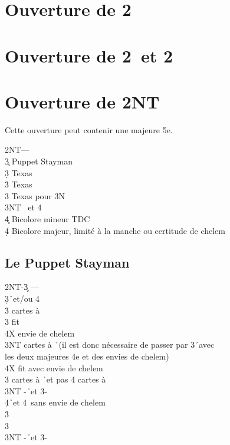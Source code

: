 \documentclass[a4paper]{article}
\begin{document}
\section{Ouverture de 2\pdfd}

\section{Ouverture de 2\pdfh\ et 2\pdfs}

\section{Ouverture de 2NT}

Cette ouverture peut contenir une majeure 5e.

\begin{bidtable}
2NT---\\
3\c \> Puppet Stayman\\
3\d \> Texas \h \\
3\h \> Texas \s \\
3\s \> Texas pour 3N\\
3NT \s\ et 4\h \\
4\c \> Bicolore mineur TDC\\
4\d \> Bicolore majeur, limité à la manche ou certitude de chelem
\end{bidtable}

\subsection{Le Puppet Stayman}

\begin{bidtable}
2NT-3\c \> ---\\
3\d {}\h\ et/ou 4\s \+\\
3\h {} cartes à \s \+\\
3\s \> fit \s \+\\
4X \> envie de chelem\-\\
3NT  cartes à \h\ (il est donc nécessaire de passer par 3\h\ avec\\
\>les deux majeures 4e et des envies de chelem)\\
\>4X fit avec envie de chelem\-\\
3\s {} cartes à \h\ et pas 4 cartes à \s \\
3NT -\h\ et 3-\s \\
4\d {}\h\ et 4\s\ sans envie de chelem\-\\
3\h {}\h \\
3\s {}\s \\
3NT -\h\ et 3-\s 
\end{bidtable}
\end{document}
